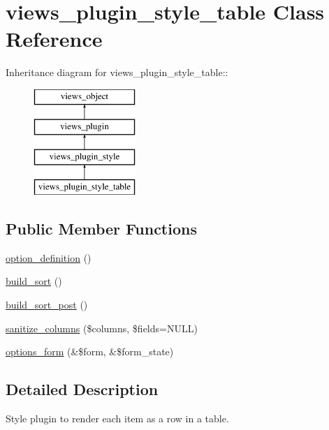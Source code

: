 \hypertarget{classviews__plugin__style__table}{
\section{views\_\-plugin\_\-style\_\-table Class Reference}
\label{classviews__plugin__style__table}
}
Inheritance diagram for views\_\-plugin\_\-style\_\-table::\begin{figure}[H]
\begin{center}
\leavevmode
\includegraphics[height=4cm]{classviews__plugin__style__table}
\end{center}
\end{figure}
\subsection*{Public Member Functions}
\begin{CompactItemize}
\item 
\hyperlink{classviews__plugin__style__table_e3d77e484f3e8ff4e2df07dfcfc44aab}{option\_\-definition} ()
\item 
\hyperlink{classviews__plugin__style__table_3bc31ba52d980f899307aee2d74bef58}{build\_\-sort} ()
\item 
\hyperlink{classviews__plugin__style__table_00d9e14ac7f545d47a43af3f9d186382}{build\_\-sort\_\-post} ()
\item 
\hyperlink{classviews__plugin__style__table_1ab90a2782f6061d998a6db033100fdc}{sanitize\_\-columns} (\$columns, \$fields=NULL)
\item 
\hyperlink{classviews__plugin__style__table_732752fb9b74bdb48673cb9ff4150be9}{options\_\-form} (\&\$form, \&\$form\_\-state)
\end{CompactItemize}


\subsection{Detailed Description}
Style plugin to render each item as a row in a table. 

